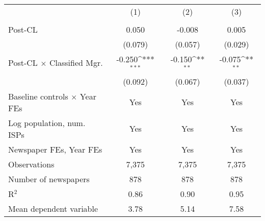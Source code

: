 {
\def\sym#1{\ifmmode^{#1}\else\(^{#1}\)\fi}
\begin{tabular}{l*{3}{c}}
\toprule
                    &&&\\
                    &&&\\
\midrule
Post-CL             &       0.050         &      -0.008         &       0.005         \\
                    &     (0.079)         &     (0.057)         &     (0.029)         \\
\addlinespace
Post-CL $\times$ Classified Mgr.&      -0.250\sym{***}&      -0.150\sym{**} &      -0.075\sym{**} \\
                    &     (0.092)         &     (0.067)         &     (0.037)         \\
\addlinespace
Baseline controls $\times$ Year FEs &         Yes         &         Yes         &         Yes         \\
\addlinespace
Log population, num. ISPs &         Yes         &         Yes         &         Yes         \\
\addlinespace
Newspaper FEs, Year FEs &         Yes         &         Yes         &         Yes         \\
\midrule
Observations        &       7,375         &       7,375         &       7,375         \\
Number of newspapers&         878         &         878         &         878         \\
R$^2$               &        0.86         &        0.90         &        0.95         \\
Mean dependent variable&        3.78         &        5.14         &        7.58         \\
\bottomrule
\end{tabular}
}
